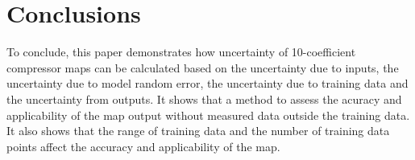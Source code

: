 \section{Conclusions} \label{sec:concl}

To conclude, this paper demonstrates how uncertainty of 10-coefficient compressor maps can be calculated based on the uncertainty due to inputs, the uncertainty due to model random error, the uncertainty due to training data and the uncertainty from outputs. It shows that a method to assess the acuracy and applicability of the map output without measured data outside the training data. It also shows that the range of training data and the number of training data points affect the accuracy and applicability of the map.